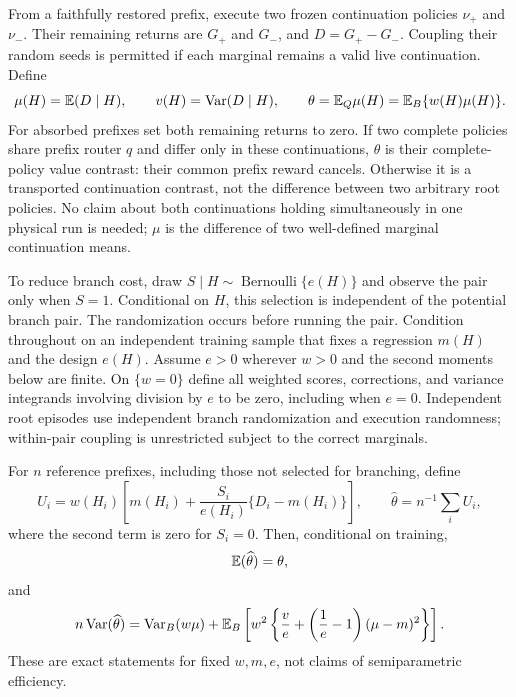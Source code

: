 From a faithfully restored prefix, execute two frozen continuation policies $\nu_+$ and $\nu_-$. Their remaining returns are $G_+$ and $G_-$, and $D=G_+-G_-$. Coupling their random seeds is permitted if each marginal remains a valid live continuation. Define
\begin{equation}
 \mu(H)=\mathbb{E}(D\mid H),\qquad v(H)=\operatorname{Var}(D\mid H),\qquad
 \theta=\mathbb{E}_Q\mu(H)=\mathbb{E}_B\{w(H)\mu(H)\}.
 \label{eq:branch-target}
\end{equation}
For absorbed prefixes set both remaining returns to zero. If two complete policies share prefix router $q$ and differ only in these continuations, $\theta$ is their complete-policy value contrast: their common prefix reward cancels. Otherwise it is a transported continuation contrast, not the difference between two arbitrary root policies. No claim about both continuations holding simultaneously in one physical run is needed; $\mu$ is the difference of two well-defined marginal continuation means.

To reduce branch cost, draw $S\mid H\sim\operatorname{Bernoulli}\{e(H)\}$ and observe the pair only when $S=1$. Conditional on $H$, this selection is independent of the potential branch pair. The randomization occurs before running the pair. Condition throughout on an independent training sample that fixes a regression $m(H)$ and the design $e(H)$. Assume $e>0$ wherever $w>0$ and the second moments below are finite. On $\{w=0\}$ define all weighted scores, corrections, and variance integrands involving division by $e$ to be zero, including when $e=0$. Independent root episodes use independent branch randomization and execution randomness; within-pair coupling is unrestricted subject to the correct marginals.

\begin{theorem}
\label{thm:branch}
For $n$ reference prefixes, including those not selected for branching, define
\begin{equation}
 U_i=w(H_i)\left[m(H_i)+\frac{S_i}{e(H_i)}\{D_i-m(H_i)\}\right],
 \qquad \widehat\theta=n^{-1}\sum_iU_i,
 \label{eq:branchscore}
\end{equation}
where the second term is zero for $S_i=0$. Then, conditional on training,
\begin{equation}
 \mathbb{E}(\widehat\theta)=\theta,
 \label{eq:branchunbiased}
\end{equation}
and
\begin{equation}
 n\operatorname{Var}(\widehat\theta)
 =\operatorname{Var}_B(w\mu)+\mathbb{E}_B\left[w^2\left\{
 \frac{v}{e}+\left(\frac1e-1\right)(\mu-m)^2
 \right\}\right].
 \label{eq:branchvariance}
\end{equation}
These are exact statements for fixed $w,m,e$, not claims of semiparametric efficiency.
\end{theorem}

